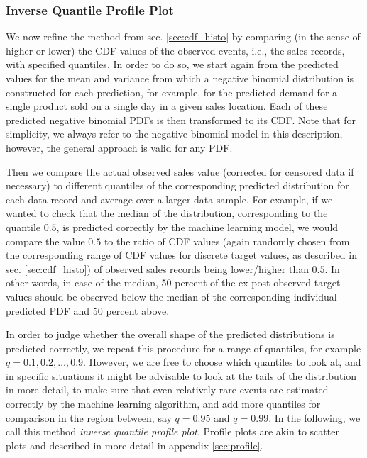 \documentclass[BCOR=1mm, DIV=calc,10pt,
twoside=true,
twocolumn,
headings=normal]{scrartcl}
\begin{document}
\subsubsection{Inverse Quantile Profile Plot}

We now refine the method from sec. \ref{sec:cdf_histo} by comparing (in the sense of higher or lower) the CDF values of the observed events, i.e., the sales records, with specified quantiles. In order to do so, we start again from the predicted values for the mean and variance from which a negative binomial distribution is constructed for each prediction, for example, for the predicted demand for a single product sold on a single day in a given sales location. Each of these predicted negative binomial PDFs is then transformed to its CDF. Note that for simplicity, we always refer to the negative binomial model in this description, however, the general approach is valid for any PDF.

Then we compare the actual observed sales value (corrected for censored data if necessary) to different quantiles of the corresponding predicted distribution for each data record and average over a larger data sample. For example, if we wanted to check that the median of the distribution, corresponding to the quantile $0.5$, is predicted correctly by the machine learning model, we would compare the value $0.5$ to the ratio of CDF values (again randomly chosen from the corresponding range of CDF values for discrete target values, as described in sec. \ref{sec:cdf_histo}) of observed sales records being lower/higher than $0.5$. In other words, in case of the median, 50 percent of the ex post observed target values should be observed below the median of the corresponding individual predicted PDF and 50 percent above.

In order to judge whether the overall shape of the predicted distributions is predicted correctly, we repeat this procedure for a range of quantiles, for example $q = 0.1, 0.2, \ldots, 0.9$. However, we are free to choose which quantiles to look at, and in specific situations it might be advisable to look at the tails of the distribution in more detail, to make sure that even relatively rare events are estimated correctly by the machine learning algorithm, and add more quantiles for comparison in the region between, say $q = 0.95$ and $q = 0.99$. In the following, we call this method {\em inverse quantile profile plot}. Profile plots are akin to scatter plots and described in more detail in appendix \ref{sec:profile}.
\end{document}
